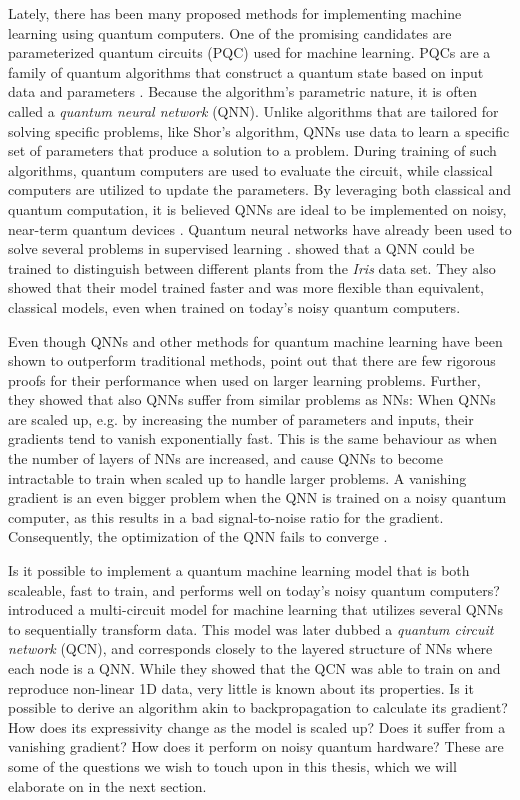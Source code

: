 Lately, there has been many proposed methods for implementing machine learning using quantum computers. One of the promising candidates are parameterized quantum circuits (PQC) used for machine learning. PQCs are a family of quantum algorithms that construct a quantum state based on input data and parameters \citet{Benedetti_2019}. Because the algorithm's parametric nature, it is often called a \emph{quantum neural network} (QNN). Unlike algorithms that are tailored for solving specific problems, like Shor's algorithm, QNNs use data to learn a specific set of parameters that produce a solution to a problem. During training of such algorithms, quantum computers are used to evaluate the circuit, while classical computers are utilized to update the parameters. By leveraging both classical and quantum computation, it is believed QNNs are ideal to be implemented on noisy, near-term quantum devices \citet{Cerezo_2021}. Quantum neural networks have already been used to solve several problems in supervised learning \cite{Benedetti_2019, abbas2020power, lloyd2018quantum}. \citet{abbas2020power} showed that a QNN could be trained to distinguish between different plants from the \emph{Iris} data set. They also showed that their model trained faster and was more flexible than equivalent, classical models, even when trained on today's noisy quantum computers.

Even though QNNs and other methods for quantum machine learning have been shown to outperform traditional methods, \citet{McClean_2018} point out that there are few rigorous proofs for their performance when used on larger learning problems. Further, they showed that also QNNs suffer from similar problems as NNs: When QNNs are scaled up, e.g. by increasing the number of parameters and inputs, their gradients tend to vanish exponentially fast. This is the same behaviour as when the number of layers of NNs are increased, and cause QNNs to become intractable to train when scaled up to handle larger problems. A vanishing gradient is an even bigger problem when the QNN is trained on a noisy quantum computer, as this results in a bad signal-to-noise ratio for the gradient. Consequently, the optimization of the QNN fails to converge \cite{skolik2020layerwise}.

Is it possible to implement a quantum machine learning model that is both scaleable, fast to train, and performs well on today's noisy quantum computers? \citet{stian} introduced a multi-circuit model for machine learning that utilizes several QNNs to sequentially transform data. This model was later dubbed a \emph{quantum circuit network} (QCN), and corresponds closely to the layered structure of NNs where each node is a QNN. While they showed that the QCN was able to train on and reproduce non-linear 1D data, very little is known about its properties. Is it possible to derive an algorithm akin to backpropagation to calculate its gradient? How does its expressivity change as the model is scaled up? Does it suffer from a vanishing gradient? How does it perform on noisy quantum hardware? These are some of the questions we wish to touch upon in this thesis, which we will elaborate on in the next section.


